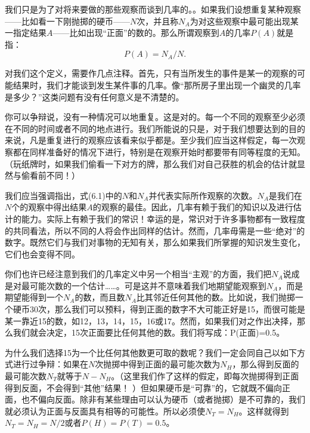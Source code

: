 \documentclass[12pt,oneside]{book}
\begin{document}
我们只是为了对将来要做的那些观察而谈到几率的。。如果我们设想重复某种观察——比如看一下刚抛掷的硬币——$N$次，并且称$N_A$为对这些观察中最可能出现某一指定结果$A$——比如出现“正面”的数的。那么所谓观察到$A$的几率$P(A)$就是指：
\begin{equation}
\label{Eq:I:6:1}
P(A)=N_A/N.
\end{equation}

对我们这个定义，需要作几点注释。首先，只有当所发生的事件是某一的观察的可能结果时，我们才能谈到发生某件事的几率。像“那所房子里出现一个幽灵的几率是多少？”这类问题有没有任何意义是不清楚的。

你可以争辩说，没有一种情况可以地重复。这是对的。每一个不同的观察至少必须在不同的时间或者不同的地点进行。我们所能说的只是，对于我们想要达到的目的来说，凡是重复进行的观察应该看来似乎都是。至少我们应当这样假定，每一次观察都在同样准备好的情况下进行，特别是在观察开始时都要带有同等程度的无知。（玩纸牌时，如果我们偷看一下对方的牌，那么我们对自己获胜的机会的估计就显然与偷看前不同！）

我们应当强调指出，式(6.1)中的$N$和$N_A$并代表实际所作观察的次数。$N_A$是我们在$N$个的观察中得出结果$A$的观察的最佳。因此，几率有赖于我们的知识以及进行估计的能力。实际上有赖于我们的常识！幸运的是，常识对于许多事物都有一致程度的共同看法，所以不同的人将会作出同样的估计。然而，几率毋需是一些“绝对”的数字。既然它们与我们对事物的无知有关，那么如果我们所掌握的知识发生变化，它们也会变得不同。

你们也许已经注意到我们的几率定义中另一个相当“主观”的方面，我们把$N_A$说成是对最可能次数的一个估计……。可是这并不意味着我们地期望能观察到$N_A$，而是期望能得到一个$N_A$的数，而且数$N_A$比其邻近任何其他的数。比如说，我们抛掷一个硬币$30$次，那么我们可以预料，得到正面的数字不大可能正好是15，而很可能是某一靠近15的数，如12，13，14，15，16或17。然而，如果我们对之作出决择，那么我们就会决定，15次正面要比任何其他的数。我们将写成：P(正面)=0.5。

为什么我们选择15为一个比任何其他数更可取的数呢？我们一定会同自己以如下方式进行过争辩：如果在$N$次抛掷中得到正面的最可能次数为$N_H$，那么得到反面的最可能次数$N_T$就等于$N-N_H$。（这里我们作了这样的假定，即每次抛掷得到正面得到反面，不会得到“其他”结果！ ）但如果硬币是“可靠”的，它就既不偏向正面，也不偏向反面。除非有某些理由可以认为硬币（或者抛掷）是不可靠的，我们就必须认为正面与反面具有相等的可能性。所以必须使$N_T=N_H$。这样就得到$N_T=N_H=N/2$或者$P(H)=P(T)=0.5$。
\end{document}
